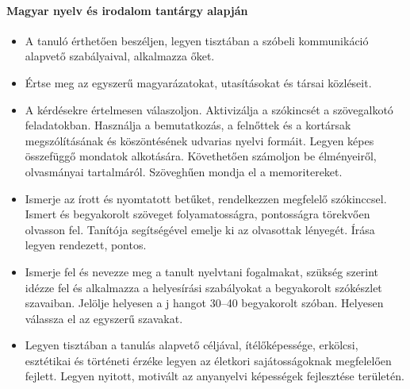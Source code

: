 \paragraph{Magyar nyelv és irodalom tantárgy alapján}
\begin{itemize}
\item A tanuló érthetően beszéljen, legyen tisztában a szóbeli kommunikáció alapvető szabályaival, alkalmazza őket.
\item Értse meg az egyszerű magyarázatokat, utasításokat és társai közléseit.
\item A kérdésekre értelmesen válaszoljon. Aktivizálja a szókincsét a szövegalkotó feladatokban. Használja a bemutatkozás, a felnőttek és a kortársak megszólításának és köszöntésének udvarias nyelvi formáit. Legyen képes összefüggő mondatok alkotására. Követhetően számoljon be élményeiről, olvasmányai tartalmáról. Szöveghűen mondja el a memoritereket.
\item Ismerje az írott és nyomtatott betűket, rendelkezzen megfelelő szókinccsel. Ismert és begyakorolt szöveget folyamatosságra, pontosságra törekvően olvasson fel. Tanítója segítségével emelje ki az olvasottak lényegét. Írása legyen rendezett, pontos.
\item Ismerje fel és nevezze meg a tanult nyelvtani fogalmakat, szükség szerint idézze fel és alkalmazza a helyesírási szabályokat a begyakorolt szókészlet szavaiban. Jelölje helyesen a j hangot 30–40 begyakorolt szóban. Helyesen válassza el az egyszerű szavakat.
\item Legyen tisztában a tanulás alapvető céljával, ítélőképessége, erkölcsi, esztétikai és történeti érzéke legyen az életkori sajátosságoknak megfelelően fejlett. Legyen nyitott, motivált az anyanyelvi képességek fejlesztése területén.
\end{itemize}
